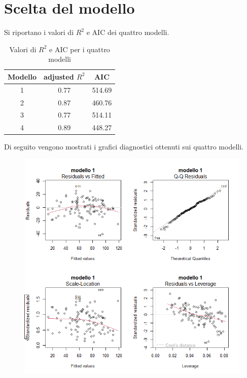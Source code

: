 \section{Scelta del modello}
Si riportano i valori di $R^2$ e AIC dei quattro modelli.
\begin{table}[H]
	\centering
	\begin{tabular}{|c|c|c|}
		\hline
		\textbf{Modello} & \textbf{adjusted} \boldmath$R^2$ & \textbf{AIC} \\
		\hline
		1 &  0.77  & 514.69 \\
		2 & 0.87 & 460.76 \\
		3 & 0.77 & 514.11 \\
		4 & 0.89 & 448.27 \\
		\hline
	\end{tabular}
	\caption{Valori di $R^2$ e AIC per i quattro modelli}
\end{table}
Di seguito vengono mostrati i grafici diagnostici ottenuti sui quattro modelli.
\begin{figure}[H]
	\centering
	\includegraphics[width=0.95\linewidth]{../graphs/diagnostica/diagnostica_ridotto}
	\label{fig:diagnosticaridotto}
\end{figure}
